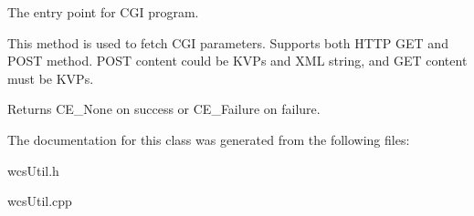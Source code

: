 The entry point for CGI program. 

This method is used to fetch CGI parameters. Supports both HTTP GET and POST method. POST content could be KVPs and XML string, and GET content must be KVPs.

\begin{DoxyReturn}{Returns}
CE\_\-None on success or CE\_\-Failure on failure. 
\end{DoxyReturn}


The documentation for this class was generated from the following files:\begin{DoxyCompactItemize}
\item 
wcsUtil.h\item 
wcsUtil.cpp\end{DoxyCompactItemize}
